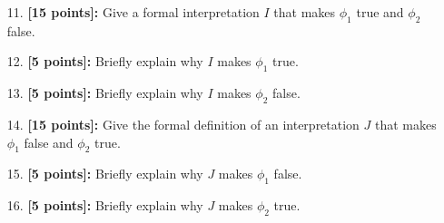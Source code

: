 \documentclass{article}
\begin{document}
\begin{enumerate}
\item[11.] \textbf{[15 points]:} Give a formal interpretation $I$ that
  makes $\phi_1$ true and $\phi_2$ false.
\end{enumerate}

\begin{enumerate}
\item[12.] \textbf{[5 points]:} Briefly explain why $I$ makes $\phi_1$
  true.
\end{enumerate}

\begin{enumerate}
\item[13.] \textbf{[5 points]:} Briefly explain why $I$ makes $\phi_2$
  false.
\end{enumerate}

\begin{enumerate}
\item[14.] \textbf{[15 points]:} Give the formal definition of an
  interpretation $J$ that makes $\phi_1$ false and $\phi_2$ true.
\end{enumerate}

\begin{enumerate}
\item[15.] \textbf{[5 points]:} Briefly explain why $J$ makes $\phi_1$
  false.
\end{enumerate}

\begin{enumerate}
\item[16.] \textbf{[5 points]:} Briefly explain why $J$ makes $\phi_2$
  true.
\end{enumerate}
\end{document}
